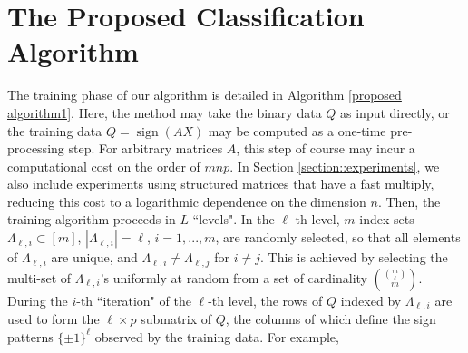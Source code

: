\documentclass[twoside,11pt]{article}
\DeclareMathOperator*{\sign}{sign}
\newcommand{\GamLi}[2]{\Lambda_{#1,#2}}  %
\newcommand{\edit}[1]{{{#1}}}
\begin{document}
\section{The Proposed Classification Algorithm} \label{section::algorithm}
The training phase of our algorithm is detailed in Algorithm \ref{proposed algorithm1}. \edit{Here, the method may take the binary data $Q$ as input directly, or the training data $Q = \sign(AX)$ may be computed as a one-time pre-processing step.  For arbitrary matrices $A$, this step of course may incur a computational cost on the order of $mnp$.  In Section \ref{section::experiments}, we also include experiments using structured matrices that have a fast multiply, reducing this cost to a logarithmic dependence on the dimension $n$.}  Then, the training algorithm proceeds in $L$ ``\edit{level}s". 
In the $\ell$-th \edit{level}, $m$ index sets $\GamLi{\ell}{i} \subset [m]$,  $|\GamLi{\ell}{i}| = \ell$, $i=1,...,m$, are randomly selected,  
so that all elements of $\GamLi{\ell}{i}$ are unique, and $\GamLi{\ell}{i} \neq \GamLi{\ell}{j}$ for $i\neq j$.
This is achieved by selecting the multi-set of $\Lambda_{\ell,i}$'s uniformly at random from a set of cardinality ${{m}\choose{\ell}}\choose m$.
During the $i$-th ``iteration" of the $\ell$-th \edit{level}, the rows of $Q$ indexed by $\GamLi{\ell}{i}$ are used to form the $\ell \times p$ \edit{submatrix of $Q$, the columns of which define the sign patterns $\{\pm 1\}^\ell$ observed by the training data.}
For example, 
\end{document}
